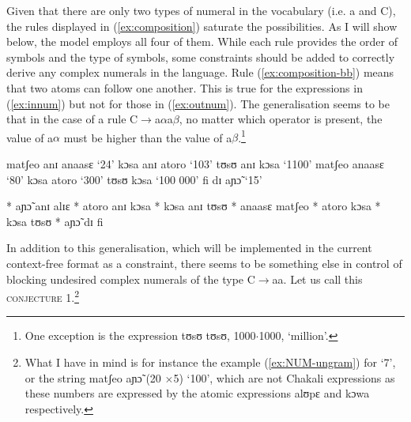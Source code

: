  Given that  there are only two
types of numeral in the vocabulary (i.e. {\W a} and  {\W C}), the rules
displayed in
(\ref{ex:composition}) saturate the possibilities. As I will show below, the
model employs all  four of them. While each rule provides the order of
symbols
and the type of symbols, some constraints should be added to correctly
derive any complex numerals in the language. Rule (\ref{ex:composition-bb})
 means that two atoms can follow one another. This is true for the
expressions in (\ref{ex:innum}) but not for those in (\ref{ex:outnum}). The
generalisation seems to
be that in the case of a rule {\W C}$\rightarrow${\W a}$\alpha${\W a}$\beta$, no
matter which
operator is present, the value of {\W a}$\alpha$
must be higher than the value of {\W a}$\beta$.\footnote{One exception is the
expression {\F tʊsʊ tʊsʊ}, 1000$\cdot$1000,  `million'.}



\begin{multicols}{2}
\begin{exe}
 \ex\label{ex:innum}

\begin{xlist}
  \ex\label{ex:} matʃeo anɪ anaasɛ `24'
   \ex\label{ex:} kɔsa anɪ atoro	`103'
 \ex\label{ex:} tʊsʊ anɪ kɔsa  `1100'
\ex\label{ex:} matʃeo  anaasɛ  `80'
\ex\label{ex:}kɔsa  atoro `300'
\ex\label{ex:}tʊsʊ kɔsa `100 000'
\ex\label{ex:} fi dɪ  aɲɔ̃  `15'
\end{xlist}
 \end{exe}  

\begin{exe}
 \ex\label{ex:outnum}

\begin{xlist}
  \ex\label{ex:NUM-ungram}*  aɲɔ̃ anɪ alɪɛ 
   \ex\label{ex:}*  atoro anɪ kɔsa 
 \ex\label{ex:}*   kɔsa anɪ tʊsʊ
 \ex\label{ex:}* anaasɛ  matʃeo   
 \ex\label{ex:}*  atoro kɔsa 
 \ex\label{ex:}*  kɔsa tʊsʊ
\ex\label{ex:}*  aɲɔ̃ dɪ fi   

\end{xlist}


\end{exe}   
\end{multicols}
 

In addition to this generalisation, which will be implemented in the current
context-free format as a constraint, there seems to be something else in control
of blocking undesired complex numerals of the type {\W C}$\rightarrow${\W aa}.
Let us call
this \textsc{conjecture 1}.\footnote{What I have in mind is for instance the
example (\ref{ex:NUM-ungram}) for  `7',  or the string {\F matʃeo aɲɔ̃}
(20
$\times$5) `100', which are not  Chakali expressions as these numbers are
expressed by the atomic expressions {\F alʊpɛ} and  {\F kɔwa} respectively.}



